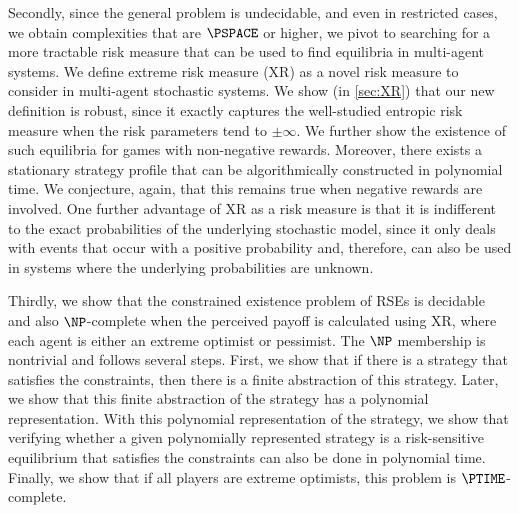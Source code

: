 Secondly, since the general problem is undecidable, and even in restricted cases, we obtain complexities that are $\PSPACE$ or higher, we pivot to searching for a more tractable risk measure that can be used to find equilibria in multi-agent systems. We define extreme risk measure (XR) as a novel risk measure to consider in multi-agent stochastic systems. We show (in \cref{sec:XR}) that our new definition is robust, since it exactly captures the well-studied entropic risk measure when the risk parameters tend to $\pm \infty$.
We further show the existence of 
such equilibria for games with non-negative rewards. Moreover, there exists a stationary strategy profile that can be algorithmically constructed in polynomial time. We conjecture, again, that this remains true when negative rewards are involved.
One further advantage of XR as a risk measure is that it is indifferent to the exact probabilities of the underlying stochastic model, since it only deals with events that occur with a positive probability and, therefore, can also be used in systems where the underlying probabilities are unknown. 

Thirdly, we show that the constrained existence problem of RSEs is decidable and also $\NP$-complete when the perceived payoff is calculated using XR, where each agent is either an extreme optimist or pessimist. The $\NP$ membership is nontrivial and follows several steps. First, we show that if there is a strategy that satisfies the constraints, then there is a finite abstraction of this strategy. Later, we show that this finite abstraction of the strategy has a polynomial representation. 
With this polynomial representation of the strategy, we show that verifying whether a given polynomially represented strategy is a risk-sensitive equilibrium that satisfies the constraints can also be done in polynomial time. 
Finally, we show that if all players are extreme optimists, this problem is $\PTIME$-complete.%
